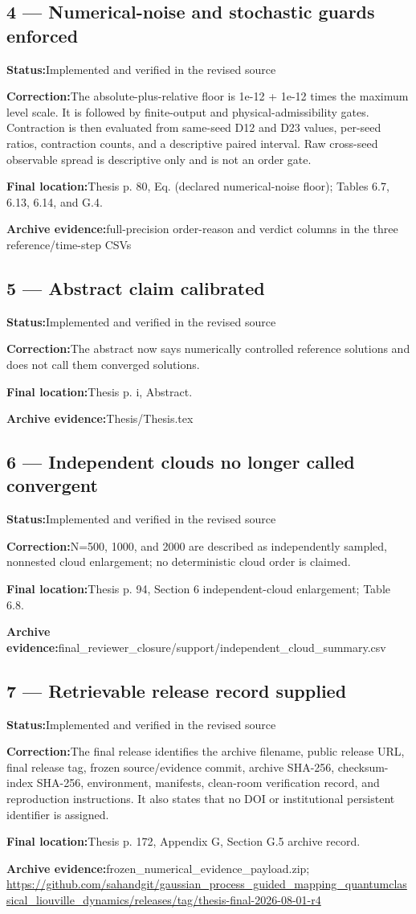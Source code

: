 \documentclass[11pt]{article}
\newcommand{\field}[2]{\textbf{#1}\quad #2\par}
\begin{document}
\subsection*{4 --- Numerical-noise and stochastic guards enforced}
\field{Status:}{Implemented and verified in the revised source}
\field{Correction:}{The absolute-plus-relative floor is 1e-12 + 1e-12 times the maximum level scale. It is followed by finite-output and physical-admissibility gates. Contraction is then evaluated from same-seed D12 and D23 values, per-seed ratios, contraction counts, and a descriptive paired interval. Raw cross-seed observable spread is descriptive only and is not an order gate.}
\field{Final location:}{Thesis p. 80, Eq. (declared numerical-noise floor); Tables 6.7, 6.13, 6.14, and G.4.}
\field{Archive evidence:}{full-precision order-reason and verdict columns in the three reference/time-step CSVs}
\subsection*{5 --- Abstract claim calibrated}
\field{Status:}{Implemented and verified in the revised source}
\field{Correction:}{The abstract now says numerically controlled reference solutions and does not call them converged solutions.}
\field{Final location:}{Thesis p. i, Abstract.}
\field{Archive evidence:}{Thesis/Thesis.tex}
\subsection*{6 --- Independent clouds no longer called convergent}
\field{Status:}{Implemented and verified in the revised source}
\field{Correction:}{N=500, 1000, and 2000 are described as independently sampled, nonnested cloud enlargement; no deterministic cloud order is claimed.}
\field{Final location:}{Thesis p. 94, Section 6 independent-cloud enlargement; Table 6.8.}
\field{Archive evidence:}{final\_reviewer\_closure/support/independent\_cloud\_summary.csv}
\subsection*{7 --- Retrievable release record supplied}
\field{Status:}{Implemented and verified in the revised source}
\field{Correction:}{The final release identifies the archive filename, public release URL, final release tag, frozen source/evidence commit, archive SHA-256, checksum-index SHA-256, environment, manifests, clean-room verification record, and reproduction instructions. It also states that no DOI or institutional persistent identifier is assigned.}
\field{Final location:}{Thesis p. 172, Appendix G, Section G.5 archive record.}
\field{Archive evidence:}{frozen\_numerical\_evidence\_payload.zip; \url{https://github.com/sahandgit/gaussian_process_guided_mapping_quantumclassical_liouville_dynamics/releases/tag/thesis-final-2026-08-01-r4}}
\end{document}
